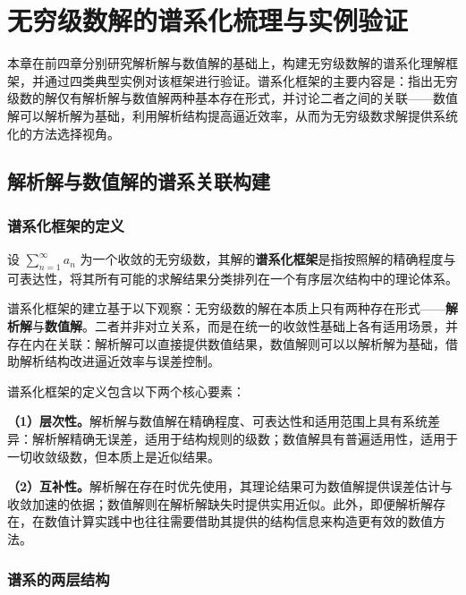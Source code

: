 
\chapter{无穷级数解的谱系化梳理与实例验证}

本章在前四章分别研究解析解与数值解的基础上，构建无穷级数解的谱系化理解框架，并通过四类典型实例对该框架进行验证。谱系化框架的主要内容是：指出无穷级数的解仅有解析解与数值解两种基本存在形式，并讨论二者之间的关联——数值解可以解析解为基础，利用解析结构提高逼近效率，从而为无穷级数求解提供系统化的方法选择视角。

\section{解析解与数值解的谱系关联构建}

\subsection{谱系化框架的定义}

\begin{definition}[谱系化框架]
设 $\displaystyle \sum_{n=1}^{\infty} a_n$ 为一个收敛的无穷级数，其解的\textbf{谱系化框架}是指按照解的精确程度与可表达性，将其所有可能的求解结果分类排列在一个有序层次结构中的理论体系。
\end{definition}

谱系化框架的建立基于以下观察：无穷级数的解在本质上只有两种存在形式——\textbf{解析解}与\textbf{数值解}。二者并非对立关系，而是在统一的收敛性基础上各有适用场景，并存在内在关联：解析解可以直接提供数值结果，数值解则可以以解析解为基础，借助解析结构改进逼近效率与误差控制。

谱系化框架的定义包含以下两个核心要素：

\textbf{（1）层次性。}解析解与数值解在精确程度、可表达性和适用范围上具有系统差异：解析解精确无误差，适用于结构规则的级数；数值解具有普遍适用性，适用于一切收敛级数，但本质上是近似结果。

\textbf{（2）互补性。}解析解在存在时优先使用，其理论结果可为数值解提供误差估计与收敛加速的依据；数值解则在解析解缺失时提供实用近似。此外，即便解析解存在，在数值计算实践中也往往需要借助其提供的结构信息来构造更有效的数值方法。

\subsection{谱系的两层结构}

